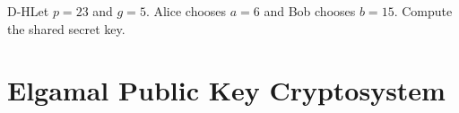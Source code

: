 \newpage

\begin{example}
    {D-H}Let \(p = 23\) and \(g = 5\). Alice chooses \(a = 6\) and Bob chooses \(b = 15\). Compute the shared secret key.
\end{example}




\section{Elgamal Public Key Cryptosystem}
\label{sec:Elgamal}

